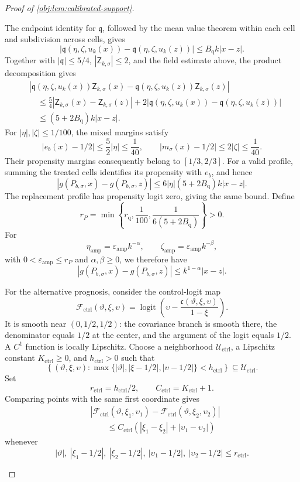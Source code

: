 \begin{proof}[Proof of \cref{obj:lem:calibrated-support}]
\begin{enumerate}
The endpoint identity for \(\mathfrak q\), followed by the mean value theorem within each cell and subdivision across cells, gives
\[
|\mathfrak q(\eta,\zeta,u_k(x))
 -\mathfrak q(\eta,\zeta,u_k(z))|
\le B_{\mathrm q}k|x-z|.
\]
Together with \(|\mathfrak q|\le5/4\), \(|\mathsf Z_{k,\sigma}|\le2\), and the field estimate above, the product decomposition gives
\[
\begin{aligned}
&|\mathfrak q(\eta,\zeta,u_k(x))\mathsf Z_{k,\sigma}(x)
 -\mathfrak q(\eta,\zeta,u_k(z))\mathsf Z_{k,\sigma}(z)|\\
&\quad\le
\frac54|\mathsf Z_{k,\sigma}(x)-\mathsf Z_{k,\sigma}(z)|
+2|\mathfrak q(\eta,\zeta,u_k(x))
      -\mathfrak q(\eta,\zeta,u_k(z))|\\
&\quad\le(5+2B_{\mathrm q})k|x-z|.
\end{aligned}
\]
For \(|\eta|,|\zeta|\le1/100\), the mixed margins satisfy
\[
|e_b(x)-1/2|\le\frac52|\eta|\le\frac1{40},
\qquad
|m_\sigma(x)-1/2|\le2|\zeta|\le\frac1{40}.
\]
Their propensity margins consequently belong to \([1/3,2/3]\). For a valid profile, summing the treated cells identifies its propensity with \(e_b\), and hence
\[
|g(P_{b,\sigma},x)-g(P_{b,\sigma},z)|
\le6|\eta|(5+2B_{\mathrm q})k|x-z|.
\]
The replacement profile has propensity logit zero, giving the same bound. Define
\[
r_P=\min\left\{r_{\mathrm q},\frac1{100},
                  \frac1{6(5+2B_{\mathrm q})}\right\}>0.
\]
For
\[
\eta_{\mathrm{amp}}
=\varepsilon_{\mathrm{amp}}k^{-\alpha},
\qquad
\zeta_{\mathrm{amp}}
=\varepsilon_{\mathrm{amp}}k^{-\beta},
\]
with \(0<\varepsilon_{\mathrm{amp}}\le r_P\) and
\(\alpha,\beta\ge0\), we therefore have
\[
|g(P_{b,\sigma},x)-g(P_{b,\sigma},z)|
\le k^{1-\alpha}|x-z|.
\]

For the alternative prognosis, consider the control-logit map
\[
\mathcal F_{\mathrm{ctrl}}(\vartheta,\xi,\upsilon)
=\operatorname{logit}\!\left(
\upsilon-\frac{\mathfrak c(\vartheta,\xi,\upsilon)}{1-\xi}
\right).
\]
It is smooth near \((0,1/2,1/2)\): the covariance branch is smooth there, the denominator equals \(1/2\) at the center, and the argument of the logit equals \(1/2\). A \(C^1\) function is locally Lipschitz. Choose a neighborhood
\(\mathcal U_{\mathrm{ctrl}}\), a Lipschitz constant
\(K_{\mathrm{ctrl}}\ge0\), and \(h_{\mathrm{ctrl}}>0\) such that
\[
\left\{(\vartheta,\xi,\upsilon):
\max\{|\vartheta|,|\xi-1/2|,|\upsilon-1/2|\}
<h_{\mathrm{ctrl}}\right\}
\subseteq\mathcal U_{\mathrm{ctrl}}.
\]
Set
\[
r_{\mathrm{ctrl}}=h_{\mathrm{ctrl}}/2,
\qquad C_{\mathrm{ctrl}}=K_{\mathrm{ctrl}}+1.
\]
Comparing points with the same first coordinate gives
\[
\begin{aligned}
&|\mathcal F_{\mathrm{ctrl}}(\vartheta,\xi_1,\upsilon_1)
 -\mathcal F_{\mathrm{ctrl}}(\vartheta,\xi_2,\upsilon_2)|\\
&\qquad\le C_{\mathrm{ctrl}}
       (|\xi_1-\xi_2|+|\upsilon_1-\upsilon_2|)
\end{aligned}
\]
whenever
\[
|\vartheta|,\ |\xi_1-1/2|,\ |\xi_2-1/2|,
\ |\upsilon_1-1/2|,\ |\upsilon_2-1/2|
\le r_{\mathrm{ctrl}}.
\]


\end{enumerate}
\end{proof}
